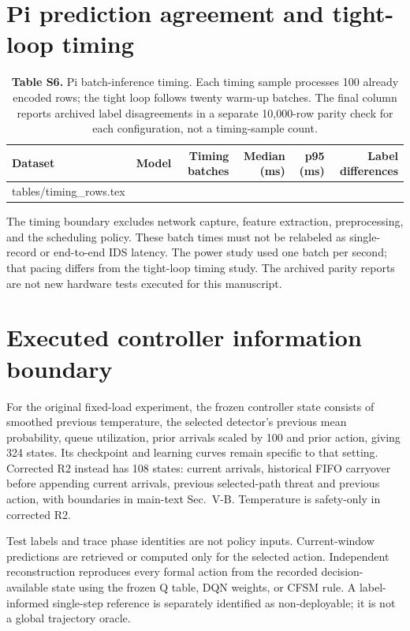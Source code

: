 \documentclass[10pt,a4paper]{article}
\makeatletter
\newcommand{\tableinput}[1]{\@@input #1.tex }
\makeatother
\begin{document}
\clearpage
\section{Pi prediction agreement and tight-loop timing}
\begin{table}[h!]
\centering\small
\caption*{\textbf{Table S6.} Pi batch-inference timing. Each timing sample processes 100 already encoded rows; the tight loop follows twenty warm-up batches. The final column reports archived label disagreements in a separate 10,000-row parity check for each configuration, not a timing-sample count.}
\begin{tabular}{llrrrr}\toprule
Dataset & Model & Timing batches & Median (ms) & p95 (ms) & Label differences\\\midrule
\tableinput{tables/timing_rows}
\bottomrule\end{tabular}
\end{table}
The timing boundary excludes network capture, feature extraction, preprocessing, and the scheduling policy. These batch times must not be relabeled as single-record or end-to-end IDS latency. The power study used one batch per second; that pacing differs from the tight-loop timing study. The archived parity reports are not new hardware tests executed for this manuscript.

\section{Executed controller information boundary}
For the original fixed-load experiment, the frozen controller state consists of smoothed previous temperature, the selected detector's previous mean probability, queue utilization, prior arrivals scaled by 100 and prior action, giving 324 states. Its checkpoint and learning curves remain specific to that setting. Corrected R2 instead has 108 states: current arrivals, historical FIFO carryover before appending current arrivals, previous selected-path threat and previous action, with boundaries in main-text Sec.~V-B. Temperature is safety-only in corrected R2.

Test labels and trace phase identities are not policy inputs. Current-window predictions are retrieved or computed only for the selected action. Independent reconstruction reproduces every formal action from the recorded decision-available state using the frozen Q table, DQN weights, or CFSM rule. A label-informed single-step reference is separately identified as non-deployable; it is not a global trajectory oracle.
\end{document}
